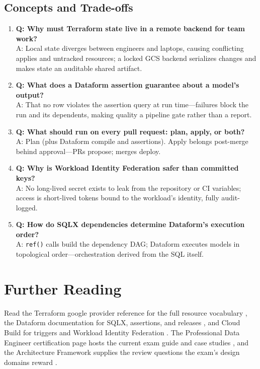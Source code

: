 \subsection{Concepts and Trade-offs}
\begin{enumerate}
    \item \textbf{Q: Why must Terraform state live in a remote backend for team work?}\\
    A: Local state diverges between engineers and laptops, causing conflicting applies and untracked resources; a locked GCS backend serializes changes and makes state an auditable shared artifact.

    \item \textbf{Q: What does a Dataform assertion guarantee about a model's output?}\\
    A: That no row violates the assertion query at run time---failures block the run and its dependents, making quality a pipeline gate rather than a report.

    \item \textbf{Q: What should run on every pull request: plan, apply, or both?}\\
    A: Plan (plus Dataform compile and assertions). Apply belongs post-merge behind approval---PRs propose; merges deploy.

    \item \textbf{Q: Why is Workload Identity Federation safer than committed keys?}\\
    A: No long-lived secret exists to leak from the repository or CI variables; access is short-lived tokens bound to the workload's identity, fully audit-logged.

    \item \textbf{Q: How do SQLX dependencies determine Dataform's execution order?}\\
    A: \texttt{ref()} calls build the dependency DAG; Dataform executes models in topological order---orchestration derived from the SQL itself.
\end{enumerate}

\section{Further Reading}
Read the Terraform google provider reference for the full resource vocabulary \cite{terraformgoogleprovider}, the Dataform documentation for SQLX, assertions, and releases \cite{googleclouddataformdocs}, and Cloud Build for triggers and Workload Identity Federation \cite{googlecloudbuilddocs}. The Professional Data Engineer certification page hosts the current exam guide and case studies \cite{googlecloudpdeexam}, and the Architecture Framework supplies the review questions the exam's design domains reward \cite{googlecloudarchitectureframework}.

